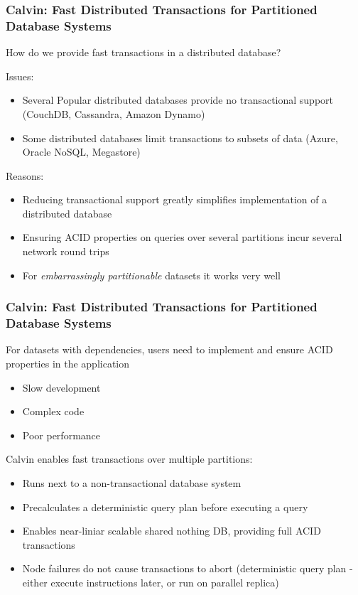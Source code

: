 \begin{frame}[plain] %
\frametitle{Calvin: Fast Distributed Transactions for Partitioned Database Systems}

How do we provide fast transactions in a distributed database?

\vspace{1em} 

Issues:
\begin{itemize}
\item Several Popular distributed databases provide no transactional support (CouchDB, Cassandra, Amazon Dynamo)
\item Some distributed databases limit transactions to subsets of data (Azure, Oracle NoSQL, Megastore)
\end{itemize}

\vspace{1em}

Reasons:
\begin{itemize}
\item Reducing transactional support greatly simplifies implementation of a distributed database
\item Ensuring ACID properties on queries over several partitions incur several network round trips
\item For \textit{embarrassingly partitionable} datasets it works very well
\end{itemize}


\end{frame}

\begin{frame}[plain] %
\frametitle{Calvin: Fast Distributed Transactions for Partitioned Database Systems}


For datasets with dependencies, users need to implement and ensure ACID properties in the application
\begin{itemize}
\item Slow development
\item Complex code
\item Poor performance
\end{itemize}

\vspace{1em}

Calvin enables fast transactions over multiple partitions:
\begin{itemize}
\item Runs next to a non-transactional database system
\item Precalculates a deterministic query plan before executing a query
\item Enables near-liniar scalable shared nothing DB, providing full ACID transactions
\item Node failures do not cause transactions to abort (deterministic query plan - either execute instructions later, or run on parallel replica)
\end{itemize}

\end{frame}



